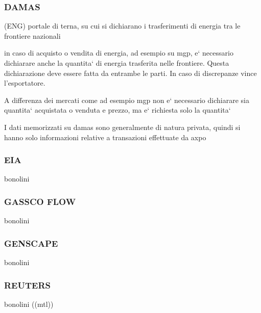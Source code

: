 
\subsubsection{DAMAS} \label{section:providers:damas}
     (ENG)
    portale di terna, su cui si dichiarano i trasferimenti di energia tra le frontiere nazionali
    
    in caso di acquisto o vendita di energia, ad esempio su mgp, e` necessario dichiarare anche la quantita` di energia trasferita nelle frontiere.
    Questa dichiarazione deve essere fatta da entrambe le parti.
    In caso di discrepanze vince l'esportatore.
    
    A differenza dei mercati come ad esempio mgp non e` necessario dichiarare sia quantita` acquistata o venduta e prezzo, ma e` richiesta solo la quantita`
    
    I dati memorizzati su damas sono generalmente di natura privata, quindi si hanno solo informazioni relative a transazioni effettuate da axpo
\subsubsection{EIA}
    bonolini
\subsubsection{GASSCO FLOW}
    bonolini
\subsubsection{GENSCAPE}
    bonolini
\subsubsection{REUTERS}
    bonolini
    ((mtl))
